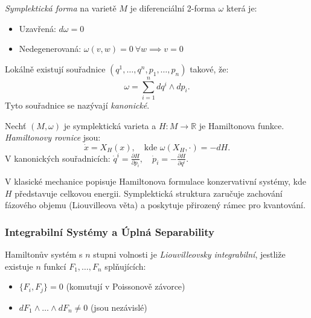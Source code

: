 \begin{definition}
\emph{Symplektická forma} na varietě $M$ je diferenciální 2-forma $\omega$ která je:
\begin{itemize}
\item Uzavřená: $d\omega = 0$
\item Nedegenerovaná: $\omega(v, w) = 0\ \forall w \implies v = 0$
\end{itemize}
\end{definition}

\begin{theorem}
Lokálně existují souřadnice $(q^1, \dots, q^n, p_1, \dots, p_n)$ takové, že:
\[
\omega = \sum_{i=1}^n dq^i \wedge dp_i.
\]
Tyto souřadnice se nazývají \emph{kanonické}.
\end{theorem}

\begin{definition}
Nechť $(M, \omega)$ je symplektická varieta a $H: M \to \mathbb{R}$ je Hamiltonova funkce. \emph{Hamiltonovy rovnice} jsou:
\[
\dot{x} = X_H(x), \quad \text{kde } \omega(X_H, \cdot) = -dH.
\]
V kanonických souřadnicích: $\dot{q}^i = \frac{\partial H}{\partial p_i}, \quad \dot{p}_i = -\frac{\partial H}{\partial q^i}$.
\end{definition}

\begin{application}
V klasické mechanice popisuje Hamiltonova formulace konzervativní systémy, kde $H$ představuje celkovou energii. Symplektická struktura zaručuje zachování fázového objemu (Liouvilleova věta) a poskytuje přirozený rámec pro kvantování.
\end{application}

\subsubsection{Integrabilní Systémy a Úplná Separability}

\begin{definition}
Hamiltonův systém s $n$ stupni volnosti je \emph{Liouvilleovsky integrabilní}, jestliže existuje $n$ funkcí $F_1, \dots, F_n$ splňujících:
\begin{itemize}
\item $\{F_i, F_j\} = 0$ (komutují v Poissonově závorce)
\item $dF_1 \wedge \dots \wedge dF_n \neq 0$ (jsou nezávislé)
\end{itemize}
\end{definition}

